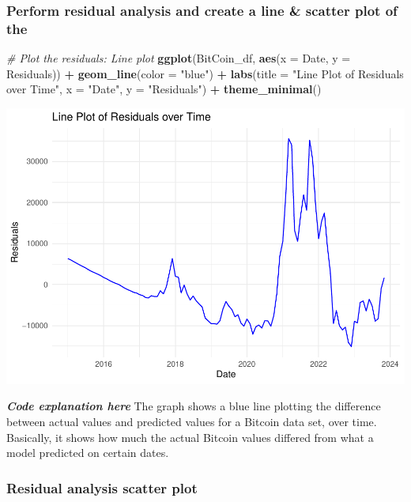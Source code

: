 \documentclass[
]{book}
\newenvironment{Shaded}{\begin{snugshade}}{\end{snugshade}}
\newcommand{\AttributeTok}[1]{\textcolor[rgb]{0.13,0.29,0.53}{#1}}
\newcommand{\CommentTok}[1]{\textcolor[rgb]{0.56,0.35,0.01}{\textit{#1}}}
\newcommand{\FunctionTok}[1]{\textcolor[rgb]{0.13,0.29,0.53}{\textbf{#1}}}
\newcommand{\NormalTok}[1]{#1}
\newcommand{\SpecialCharTok}[1]{\textcolor[rgb]{0.81,0.36,0.00}{\textbf{#1}}}
\newcommand{\StringTok}[1]{\textcolor[rgb]{0.31,0.60,0.02}{#1}}
\begin{document}
\subsubsection{Perform residual analysis and create a line \& scatter plot of the}\label{perform-residual-analysis-and-create-a-line-scatter-plot-of-the}

\begin{Shaded}
\begin{Highlighting}[]
\CommentTok{\# Plot the residuals: Line plot}
\FunctionTok{ggplot}\NormalTok{(BitCoin\_df, }\FunctionTok{aes}\NormalTok{(}\AttributeTok{x =}\NormalTok{ Date, }\AttributeTok{y =}\NormalTok{ Residuals)) }\SpecialCharTok{+}
  \FunctionTok{geom\_line}\NormalTok{(}\AttributeTok{color =} \StringTok{"blue"}\NormalTok{) }\SpecialCharTok{+}
  \FunctionTok{labs}\NormalTok{(}\AttributeTok{title =} \StringTok{"Line Plot of Residuals over Time"}\NormalTok{,}
       \AttributeTok{x =} \StringTok{"Date"}\NormalTok{,}
       \AttributeTok{y =} \StringTok{"Residuals"}\NormalTok{) }\SpecialCharTok{+}
  \FunctionTok{theme\_minimal}\NormalTok{()}
\end{Highlighting}
\end{Shaded}

\includegraphics{bookdown-demo_files/figure-latex/unnamed-chunk-21-1.pdf}

\emph{\textbf{Code explanation here}}
The graph shows a blue line plotting the difference between actual values and predicted values for a Bitcoin data set, over time. Basically, it shows how much the actual Bitcoin values differed from what a model predicted on certain dates.

\subsubsection{Residual analysis scatter plot}\label{residual-analysis-scatter-plot}
\end{document}
